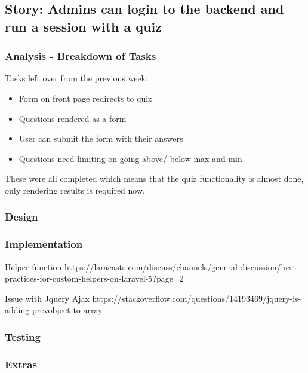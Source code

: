 \subsection{Story: Admins can login to the backend and run a session with a quiz}
\subsubsection{Analysis - Breakdown of Tasks}
Tasks left over from the previous week:
\begin{itemize}
	\item Form on front page redirects to quiz
	\item Questions rendered as a form
	\item User can submit the form with their answers
	\item Questions need limiting on going above/ below max and min
\end{itemize}
These were all completed which means that the quiz functionality is almost done, only rendering results is required now.
\subsubsection{Design}
\subsubsection{Implementation}
Helper function https://laracasts.com/discuss/channels/general-discussion/best-practices-for-custom-helpers-on-laravel-5?page=2

Issue with Jquery Ajax https://stackoverflow.com/questions/14193469/jquery-is-adding-prevobject-to-array
\subsubsection{Testing}
\subsubsection{Extras}
\newpage

